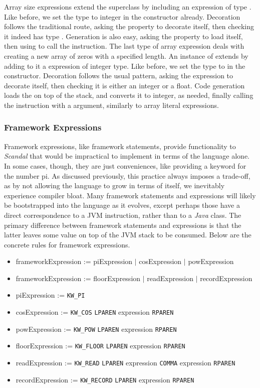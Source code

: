 Array size expressions extend the superclass by including an expression of type . Like before, we set the type to integer in the constructor already. Decoration follows the traditional route, asking the  property to decorate itself, then checking it indeed has type . Generation is also easy, asking the  property to load itself, then using  to call the  instruction. The last type of array expression deals with creating a new array of zeros with a specified length. An instance of  extends  by adding to it a  expression of integer type. Like before, we set the type to  in the constructor. Decoration follows the usual pattern, asking the  expression to decorate itself, then checking it is either an integer or a float. Code generation loads the  on top of the stack, and converts it to integer, as needed, finally calling the  instruction with a  argument, similarly to array literal expressions.

\subsubsection{Framework Expressions}

Framework expressions, like framework statements, provide functionality to \emph{Scandal} that would be impractical to implement in terms of the language alone. In some cases, though, they are just conveniences, like providing a keyword for the number pi. As discussed previously, this practice always imposes a trade-off, as by not allowing the language to grow in terms of itself, we inevitably experience compiler bloat. Many framework statements and expressions will likely be bootstrapped into the language as it evolves, except perhaps those have a direct correspondence to a JVM instruction, rather than to a \emph{Java} class. The primary difference between framework statements and expressions is that the latter leaves some value on top of the JVM stack to be consumed. Below are the concrete rules for framework expressions.

\begin{itemize}
	\item frameworkExpression := piExpression $|$ cosExpression $|$ powExpression
	\item frameworkExpression := floorExpression $|$ readExpression $|$ recordExpression
	\item piExpression := \texttt{KW\_PI}
	\item cosExpression := \texttt{KW\_COS} \texttt{LPAREN} expression \texttt{RPAREN}
	\item powExpression := \texttt{KW\_POW} \texttt{LPAREN} expression \texttt{RPAREN}
	\item floorExpression := \texttt{KW\_FLOOR} \texttt{LPAREN} expression \texttt{RPAREN}
	\item readExpression := \texttt{KW\_READ} \texttt{LPAREN} expression \texttt{COMMA} expression \texttt{RPAREN}
	\item recordExpression := \texttt{KW\_RECORD} \texttt{LPAREN} expression \texttt{RPAREN}
\end{itemize}

